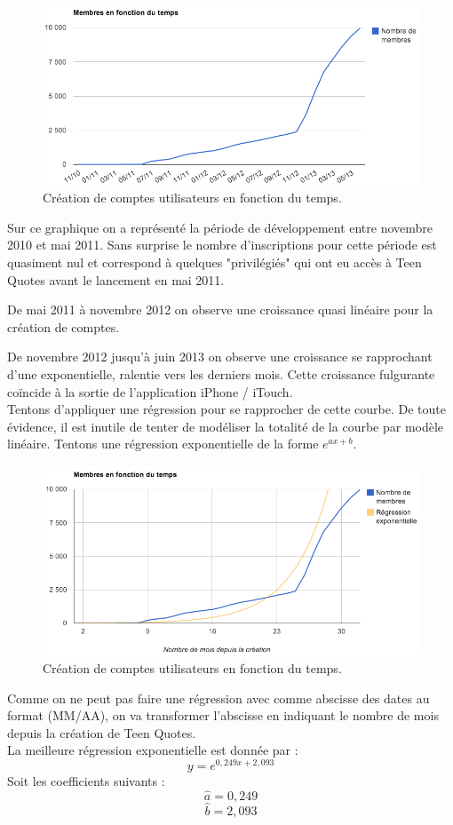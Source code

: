 \documentclass{report}
\begin{document}
	\begin{figure}[H]
		\center
		\includegraphics[width=450px]{images/membresTemps.png}
		\caption{Création de comptes utilisateurs en fonction du temps.}
	\end{figure}
	Sur ce graphique on a représenté la période de développement entre novembre 2010 et mai 2011. Sans surprise le nombre d'inscriptions pour cette période est quasiment nul et correspond à quelques "privilégiés" qui ont eu accès à Teen Quotes avant le lancement en mai 2011.

	De mai 2011 à novembre 2012 on observe une croissance quasi linéaire pour la création de comptes.

	De novembre 2012 jusqu'à juin 2013 on observe une croissance se rapprochant d'une exponentielle, ralentie vers les derniers mois. Cette croissance fulgurante coïncide à la sortie de l'application iPhone / iTouch.\\

	Tentons d'appliquer une régression pour se rapprocher de cette courbe. De toute évidence, il est inutile de tenter de modéliser la totalité de la courbe par modèle linéaire. Tentons une régression exponentielle de la forme $e^{ax + b}$.
	\begin{figure}[H]
		\center
		\includegraphics[width=450px]{images/membresRegression.png}
		\caption{Création de comptes utilisateurs en fonction du temps.}
	\end{figure}
	Comme on ne peut pas faire une régression avec comme abscisse des dates au format (MM/AA), on va transformer l'abscisse en indiquant le nombre de mois depuis la création de Teen Quotes.\\
	La meilleure régression exponentielle est donnée par :
	\[y = e^{0,249x + 2,093}\]
	Soit les coefficients suivants :
	\[\widehat{a} = 0,249\]
	\[\widehat{b} = 2,093\]
\end{document}

